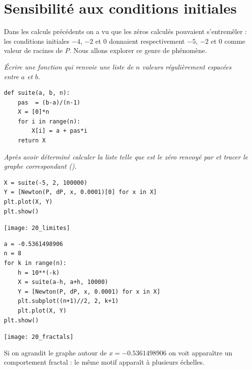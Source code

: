 \section{Sensibilité aux conditions initiales}
Dans les calculs précédents on a vu que les zéros calculés pouvaient s'entremêler : 
les conditions initiales $-4$, $-2$ et 0 donnaient respectivement $-5$, $-2$ et $0$ comme valeur de racines de $P$. Nous allons explorer ce genre de phénomène.
\begin{Exercise}\it
Écrire une fonction  qui renvoie une liste de $n$ valeurs régulièrement espacées entre $a$ et $b$.
\end{Exercise}
\begin{Answer}
\begin{lstlisting}
def suite(a, b, n):
    pas  = (b-a)/(n-1)
    X = [0]*n
    for i in range(n):
        X[i] = a + pas*i
    return X
\end{lstlisting}
\end{Answer}
\begin{Exercise}\it
Après avoir déterminé  calculer la liste  telle que 
 est le zéro renvoyé par  et tracer le graphe correspondant ().
\end{Exercise}
\begin{Answer}
\begin{lstlisting}
X = suite(-5, 2, 100000)
Y = [Newton(P, dP, x, 0.0001)[0] for x in X]
plt.plot(X, Y)
plt.show()
\end{lstlisting}
\begin{center}
\texttt{[image: 20\_limites]}
\end{center}
\begin{lstlisting}
a = -0.5361498906
n = 8
for k in range(n):
    h = 10**(-k)
    X = suite(a-h, a+h, 10000)
    Y = [Newton(P, dP, x, 0.0001) for x in X]
    plt.subplot((n+1)//2, 2, k+1)
    plt.plot(X, Y)
plt.show()
\end{lstlisting}
\begin{center}
\hbox{}\kern -3cm\texttt{[image: 20\_fractals]}
\end{center}
\end{Answer}
Si on agrandit le graphe autour de $x = -0.5361498906$ on voit apparaître un comportement fractal : le même motif apparaît à plusieurs échelles.
\newpage
